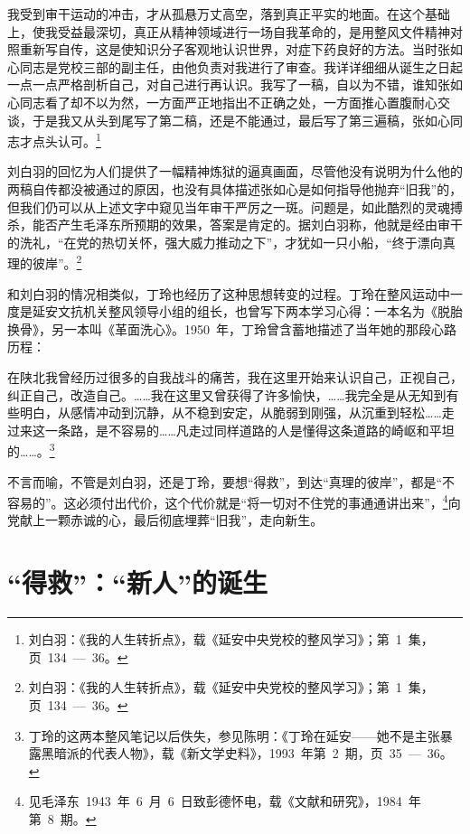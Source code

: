 \begin{quoting}
我受到审干运动的冲击，才从孤悬万丈高空，落到真正平实的地面。在这个基础上，使我受益最深切，真正从精神领域进行一场自我革命的，是用整风文件精神对照重新写自传，这是使知识分子客观地认识世界，对症下药良好的方法。当时张如心同志是党校三部的副主任，由他负责对我进行了审查。我详详细细从诞生之日起一点一点严格剖析自己，对自己进行再认识。我写了一稿，自以为不错，谁知张如心同志看了却不以为然，一方面严正地指出不正确之处，一方面推心置腹耐心交谈，于是我又从头到尾写了第二稿，还是不能通过，最后写了第三遍稿，张如心同志才点头认可。\footnote{刘白羽：《我的人生转折点》，载《延安中央党校的整风学习》；第~1~集，页~134~—~36。}
\end{quoting}

刘白羽的回忆为人们提供了一幅精神炼狱的逼真画面，尽管他没有说明为什么他的两稿自传都没被通过的原因，也没有具体描述张如心是如何指导他抛弃“旧我”的，但我们仍可以从上述文字中窥见当年审干严厉之一斑。问题是，如此酷烈的灵魂搏杀，能否产生毛泽东所预期的效果，答案是肯定的。据刘白羽称，他就是经由审干的洗礼，“在党的热切关怀，强大威力推动之下”，才犹如一只小船，“终于漂向真理的彼岸”。\footnote{刘白羽：《我的人生转折点》，载《延安中央党校的整风学习》；第~1~集，页~134~—~36。}

和刘白羽的情况相类似，丁玲也经历了这种思想转变的过程。丁玲在整风运动中一度是延安文抗机关整风领导小组的组长，也曾写下两本学习心得：一本名为《脱胎换骨》，另一本叫《革面洗心》。1950~年，丁玲曾含蓄地描述了当年她的那段心路历程：

\begin{quoting}
在陕北我曾经历过很多的自我战斗的痛苦，我在这里开始来认识自己，正视自己，纠正自己，改造自己。……我在这里又曾获得了许多愉快，……我完全是从无知到有些明白，从感情冲动到沉静，从不稳到安定，从脆弱到刚强，从沉重到轻松……走过来这一条路，是不容易的……凡走过同样道路的人是懂得这条道路的崎岖和平坦的……。\footnote{丁玲的这两本整风笔记以后佚失，参见陈明：《丁玲在延安——她不是主张暴露黑暗派的代表人物》，载《新文学史料》，1993~年第~2~期，页~35~—~36。}
\end{quoting}

不言而喻，不管是刘白羽，还是丁玲，要想“得救”，到达“真理的彼岸”，都是“不容易的”。这必须付出代价，这个代价就是“将一切对不住党的事通通讲出来”，\footnote{见毛泽东~1943~年~6~月~6~日致彭德怀电，载《文献和研究》，1984~年第~8~期。}向党献上一颗赤诚的心，最后彻底埋葬“旧我”，走向新生。

\section{“得救”：“新人”的诞生}

